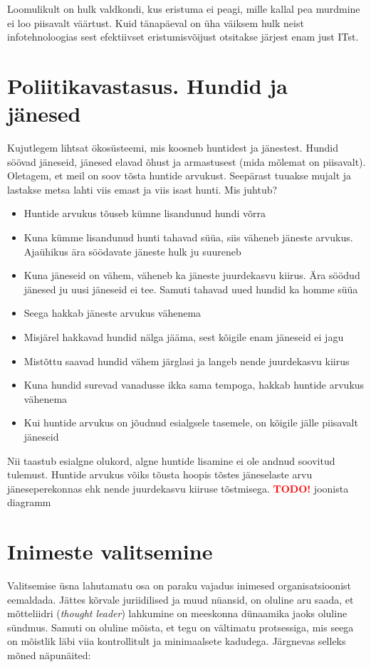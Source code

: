 \documentclass{tufte-book}
\newcommand{\TODO}{\textcolor{red}{\bf TODO!}\xspace}
\begin{document}
Loomulikult on hulk valdkondi, kus eristuma ei peagi, mille kallal pea murdmine ei loo piisavalt väärtust. Kuid tänapäeval on üha väiksem hulk neist infotehnoloogias sest efektiivset eristumisvõijust otsitakse järjest enam just ITst.

\section{Poliitikavastasus. Hundid ja jänesed}
Kujutlegem lihtsat ökosüsteemi, mis koosneb huntidest ja jänestest. Hundid söövad jäneseid, jänesed elavad õhust ja armastusest (mida mõlemat on piisavalt). Oletagem, et meil on soov tõsta huntide arvukust. Seepärast tuuakse mujalt ja lastakse metsa lahti viis emast ja viis isast hunti. Mis juhtub? 
\begin{itemize}
	\item Huntide arvukus tõuseb kümne lisandunud hundi võrra
	\item Kuna kümme lisandunud hunti tahavad süüa, siis väheneb jäneste arvukus. Ajaühikus ära söödavate jäneste hulk ju suureneb
	\item Kuna jäneseid on vähem, väheneb ka jäneste juurdekasvu kiirus. Ära söödud jänesed ju uusi jäneseid ei tee. Samuti tahavad uued hundid ka homme süüa
	\item Seega hakkab jäneste arvukus vähenema
	\item Misjärel hakkavad hundid nälga jääma, sest kõigile enam jäneseid ei jagu
	\item Mistõttu saavad hundid vähem järglasi ja langeb nende juurdekasvu kiirus
	\item Kuna hundid surevad vanadusse ikka sama tempoga, hakkab huntide arvukus vähenema
	\item Kui huntide arvukus on jõudnud esialgsele tasemele, on kõigile jälle piisavalt jäneseid 
\end{itemize}

Nii taastub esialgne olukord, algne huntide lisamine ei ole andnud soovitud tulemust. Huntide arvukus võiks tõusta hoopis tõstes jäneselaste arvu jäneseperekonnas ehk nende juurdekasvu kiiruse tõstmisega. 
\TODO joonista diagramm

\section{Inimeste valitsemine}
Valitsemise üsna lahutamatu osa on paraku vajadus inimesed organisatsioonist eemaldada. Jättes kõrvale juriidilised ja muud nüansid, on oluline aru saada, et mõtteliidri (\emph{thought leader}) lahkumine on meeskonna dünaamika jaoks oluline sündmus. Samuti on oluline mõista, et tegu on vältimatu protsessiga, mis seega on mõistlik läbi viia kontrollitult ja minimaalsete kadudega. Järgnevas selleks mõned näpunäited: 
\end{document}
